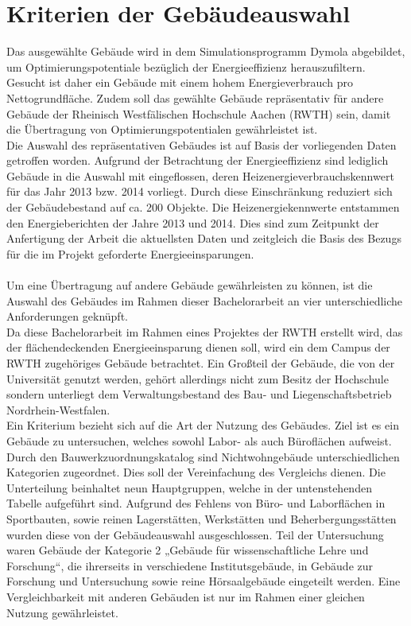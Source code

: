 \section{Kriterien der Gebäudeauswahl}
\label{sec:Kriterien der Gebäudeauswahl}
Das ausgewählte Gebäude wird in dem Simulationsprogramm Dymola abgebildet, um Optimierungspotentiale bezüglich der Energieeffizienz herauszufiltern. Gesucht ist daher ein Gebäude mit einem hohem Energieverbrauch pro Nettogrundfläche. Zudem soll das gewählte Gebäude repräsentativ für andere Gebäude der Rheinisch Westfälischen Hochschule Aachen (RWTH) sein, damit die Übertragung von Optimierungspotentialen gewährleistet ist.\\
Die Auswahl des repräsentativen Gebäudes ist auf Basis der vorliegenden Daten getroffen worden. Aufgrund der Betrachtung der Energieeffizienz sind lediglich Gebäude in die Auswahl mit eingeflossen, deren Heizenergieverbrauchskennwert für das Jahr 2013 bzw. 2014 vorliegt. Durch diese Einschränkung reduziert sich der Gebäudebestand auf ca. 200 Objekte. Die Heizenergiekennwerte entstammen den Energieberichten der Jahre 2013 und 2014. Dies sind zum Zeitpunkt der Anfertigung der Arbeit die aktuellsten Daten und zeitgleich die Basis des Bezugs für die im Projekt geforderte Energieeinsparungen.\\
\\
Um eine Übertragung auf andere Gebäude gewährleisten zu können, ist die Auswahl des Gebäudes im Rahmen dieser Bachelorarbeit an vier unterschiedliche Anforderungen geknüpft. \\

Da diese Bachelorarbeit im Rahmen eines Projektes der RWTH erstellt wird, das der flächendeckenden Energieeinsparung dienen soll, wird ein dem Campus der RWTH zugehöriges Gebäude betrachtet. Ein Großteil der Gebäude, die von der Universität genutzt werden, gehört allerdings nicht zum Besitz der Hochschule sondern unterliegt dem Verwaltungsbestand des Bau- und Liegenschaftsbetrieb Nordrhein-Westfalen. \\
Ein Kriterium bezieht sich auf die Art der Nutzung des Gebäudes. Ziel ist es ein Gebäude zu untersuchen, welches sowohl Labor- als auch Büroflächen aufweist. Durch den Bauwerkzuordnungskatalog sind Nichtwohngebäude unterschiedlichen Kategorien zugeordnet. Dies soll der Vereinfachung des Vergleichs dienen. Die Unterteilung beinhaltet neun Hauptgruppen, welche in der untenstehenden Tabelle aufgeführt sind. 
Aufgrund des Fehlens von Büro- und Laborflächen in Sportbauten, sowie reinen Lagerstätten, Werkstätten und Beherbergungsstätten wurden diese von der Gebäudeauswahl ausgeschlossen. Teil der Untersuchung waren Gebäude der Kategorie 2 „Gebäude für wissenschaftliche Lehre und Forschung“, die ihrerseits in verschiedene Institutsgebäude, in Gebäude zur Forschung und Untersuchung sowie reine Hörsaalgebäude eingeteilt werden. Eine Vergleichbarkeit mit anderen Gebäuden ist nur im Rahmen einer gleichen Nutzung gewährleistet.\\

